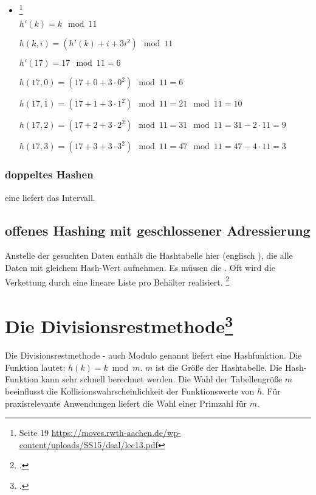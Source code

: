 \documentclass{lehramt-informatik-haupt}
\begin{document}
\begin{itemize}
%

\item {}
\footnote{Seite 19 \url{https://moves.rwth-aachen.de/wp-content/uploads/SS15/dsal/lec13.pdf}}

$h'(k) = k \mod 11$

$h(k, i) = (h'(k) + i + 3i^2) \mod 11$

$h'(17) = 17 \mod 11 = 6$


$h(17, 0) = (17 + 0 + 3 \cdot 0^2) \mod 11 = 6$

$h(17, 1) = (17 + 1 + 3 \cdot 1^2) \mod 11 = 21 \mod 11 = 10$

$h(17, 2) = (17 + 2 + 3 \cdot 2^2) \mod 11 = 31 \mod 11 = 31 - 2 \cdot 11 = 9$

$h(17, 3) = (17 + 3 + 3 \cdot 3^2) \mod 11 = 47 \mod 11 = 47 - 4 \cdot 11 = 3$

\end{itemize}

\subsubsection{doppeltes Hashen}

eine  liefert das Intervall.

%

\subsection{offenes Hashing mit geschlossener Adressierung}

Anstelle der gesuchten Daten enthält die Hashtabelle hier
 (englisch ), die alle Daten mit gleichem
Hash-Wert aufnehmen. Es müssen die . Oft wird die Verkettung durch eine lineare Liste pro
Behälter realisiert.
\footcite{wiki:hashtabelle}

%

\section{Die Divisionsrestmethode\footcite{wiki:divisionsrestmethode}}

Die Divisionsrestmethode - auch Modulo genannt liefert eine
Hashfunktion. Die Funktion lautet:  $h(k)=k{\bmod {m}}$. $m$ ist die
Größe der Hashtabelle. Die Hash-Funktion kann sehr schnell berechnet
werden. Die Wahl der Tabellengröße $m$ beeinflusst die
Kollisionswahrscheinlichkeit der Funktionswerte von $h$. Für
praxisrelevante Anwendungen liefert die Wahl einer Primzahl für $m$.
\end{document}
